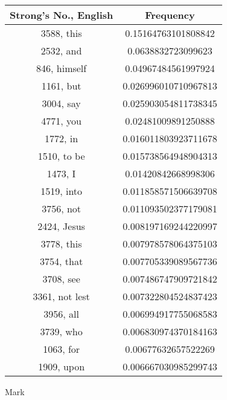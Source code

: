 \documentclass[12pt,letterpaper]{article}
\begin{document}
 \begin{longtable}{|c|c|}
\hline
 Strong's No., English & Frequency \\ \hline  
3588, this & 0.15164763101808842\\ \hline 
 2532, and & 0.0638832723099623\\ \hline 
 846, himself & 0.04967484561997924\\ \hline 
 1161, but & 0.026996010710967813\\ \hline 
 3004, say & 0.025903054811738345\\ \hline 
 4771, you & 0.02481009891250888\\ \hline 
 1772, in & 0.016011803923711678\\ \hline 
 1510, to be & 0.015738564948904313\\ \hline 
 1473, I & 0.01420842668998306\\ \hline 
 1519, into & 0.011858571506639708\\ \hline 
 3756, not & 0.011093502377179081\\ \hline 
 2424, Jesus & 0.008197169244220997\\ \hline 
 3778, this & 0.007978578064375103\\ \hline 
 3754, that & 0.007705339089567736\\ \hline 
 3708, see & 0.007486747909721842\\ \hline 
 3361, not lest & 0.007322804524837423\\ \hline 
 3956, all & 0.006994917755068583\\ \hline 
 3739, who & 0.006830974370184163\\ \hline 
 1063, for & 0.00677632657522269\\ \hline 
 1909, upon & 0.006667030985299743\\ \hline 
\end{longtable} 
 

Mark
\end{document}

